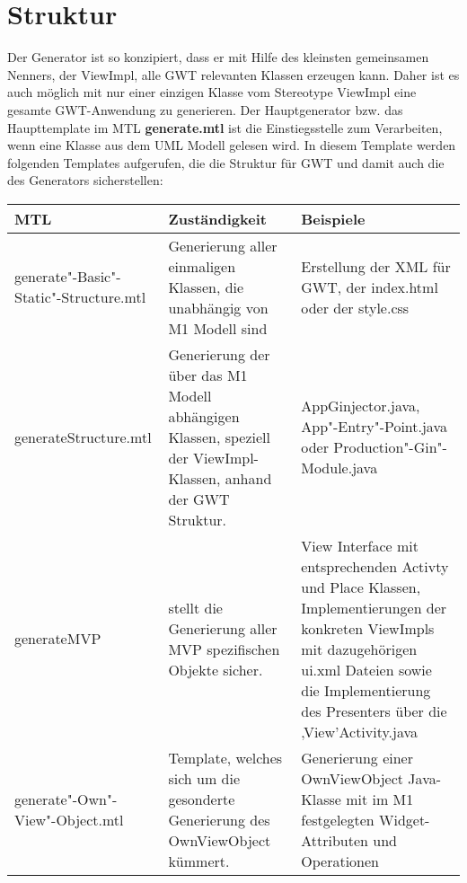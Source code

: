 \section{Struktur} \label{StrukturFunktion}
Der Generator ist so konzipiert, dass er mit Hilfe des kleinsten gemeinsamen Nenners, der ViewImpl, alle GWT relevanten Klassen erzeugen kann. Daher ist es auch möglich mit nur einer einzigen Klasse vom Stereotype ViewImpl eine gesamte GWT-Anwendung zu generieren.
Der Hauptgenerator bzw. das Haupttemplate im MTL \textbf{generate.mtl} ist die Einstiegsstelle zum Verarbeiten, wenn eine Klasse aus dem UML Modell gelesen wird. In diesem Template werden folgenden Templates aufgerufen, die die Struktur für GWT und damit auch die des Generators sicherstellen: \\

\begin{center} 
    \begin{tabular}{   p{}   p{}  p{} } 
  
    \textbf{MTL} & \textbf{Zuständigkeit} & \textbf{Beispiele}\\ \hline
\hline
   generate"-Basic"-Static"-Structure.mtl   &  Generierung aller einmaligen Klassen, die unabhängig von M1 Modell sind  &   Erstellung der XML für GWT, der index.html oder der style.css\\ \hline

    generateStructure.mtl &  Generierung der über das M1 Modell abhängigen Klassen, speziell der ViewImpl-Klassen, anhand der GWT Struktur.& AppGinjector.java, App"-Entry"-Point.java oder Production"-Gin"-Module.java\\ \hline

 generateMVP &  stellt die Generierung aller MVP spezifischen Objekte sicher. &  View Interface mit entsprechenden Activty und Place Klassen, Implementierungen der konkreten ViewImpls mit dazugehörigen ui.xml Dateien sowie die Implementierung des Presenters über die ‚View’Activity.java \\ \hline

generate"-Own"-View"-Object.mtl &  Template, welches sich um die gesonderte Generierung des OwnViewObject kümmert. & Generierung einer OwnViewObject Java-Klasse mit im M1 festgelegten Widget-Attributen und Operationen \\\hline

    \end{tabular}
\end{center}

